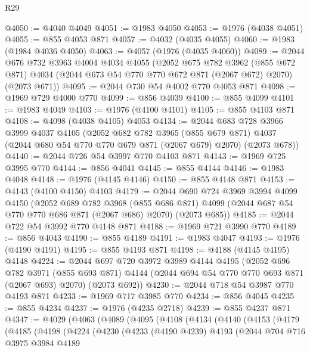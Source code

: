 \begin{lexlean}{R29}
\begin{coremodule}
@4050 := @4040 @4049
@4051 := @1983 @4050
@4053 := @1976 (@4038 @4051)
@4055 := @855 @4053 @871
@4057 := @4032 (@4035 @4055)
@4060 := @1983 (@1984 @4036 @4050)
@4063 := @4057 (@1976 (@4035 @4060))
@4089 := @2044
    @676
    @732
    @3963
    @4004
    @4034
    @4055
    (@2052
      @675
      @782
      @3962
      (@855 @672 @871)
      @4034
      (@2044 @673 @54 @770 @770 @672 @871 (@2067 @672) @2070)
      (@2073 @671))
@4095 := @2044 @730 @54 @4002 @770 @4053 @871
@4098 := @1969 @729 @4000 @770
@4099 := @856 @4039
@4100 := @855 @4099
@4101 := @1983 @4049
@4103 := @1976 (@4100 @4101)
@4105 := @855 @4103 @871
@4108 := @4098 (@4038 @4105) @4053
@4134 := @2044
    @683
    @728
    @3966
    @3999
    @4037
    @4105
    (@2052
      @682
      @782
      @3965
      (@855 @679 @871)
      @4037
      (@2044 @680 @54 @770 @770 @679 @871 (@2067 @679) @2070)
      (@2073 @678))
@4140 := @2044 @726 @54 @3997 @770 @4103 @871
@4143 := @1969 @725 @3995 @770
@4144 := @856 @4041
@4145 := @855 @4144
@4146 := @1983 @4048
@4148 := @1976 (@4145 @4146)
@4150 := @855 @4148 @871
@4153 := @4143 (@4100 @4150) @4103
@4179 := @2044
    @690
    @724
    @3969
    @3994
    @4099
    @4150
    (@2052
      @689
      @782
      @3968
      (@855 @686 @871)
      @4099
      (@2044 @687 @54 @770 @770 @686 @871 (@2067 @686) @2070)
      (@2073 @685))
@4185 := @2044 @722 @54 @3992 @770 @4148 @871
@4188 := @1969 @721 @3990 @770
@4189 := @856 @4043
@4190 := @855 @4189
@4191 := @1983 @4047
@4193 := @1976 (@4190 @4191)
@4195 := @855 @4193 @871
@4198 := @4188 (@4145 @4195) @4148
@4224 := @2044
    @697
    @720
    @3972
    @3989
    @4144
    @4195
    (@2052
      @696
      @782
      @3971
      (@855 @693 @871)
      @4144
      (@2044 @694 @54 @770 @770 @693 @871 (@2067 @693) @2070)
      (@2073 @692))
@4230 := @2044 @718 @54 @3987 @770 @4193 @871
@4233 := @1969 @717 @3985 @770
@4234 := @856 @4045
@4235 := @855 @4234
@4237 := @1976 (@4235 @2718)
@4239 := @855 @4237 @871
@4347 := @4029
    (@4063
      (@4089
        (@4095
          (@4108
            (@4134
              (@4140
                (@4153
                  (@4179
                    (@4185
                      (@4198
                        (@4224
                          (@4230
                            (@4233
                              (@4190 @4239)
                              @4193
                              (@2044
                                @704
                                @716
                                @3975
                                @3984
                                @4189

\end{coremodule}
\end{lexlean}
